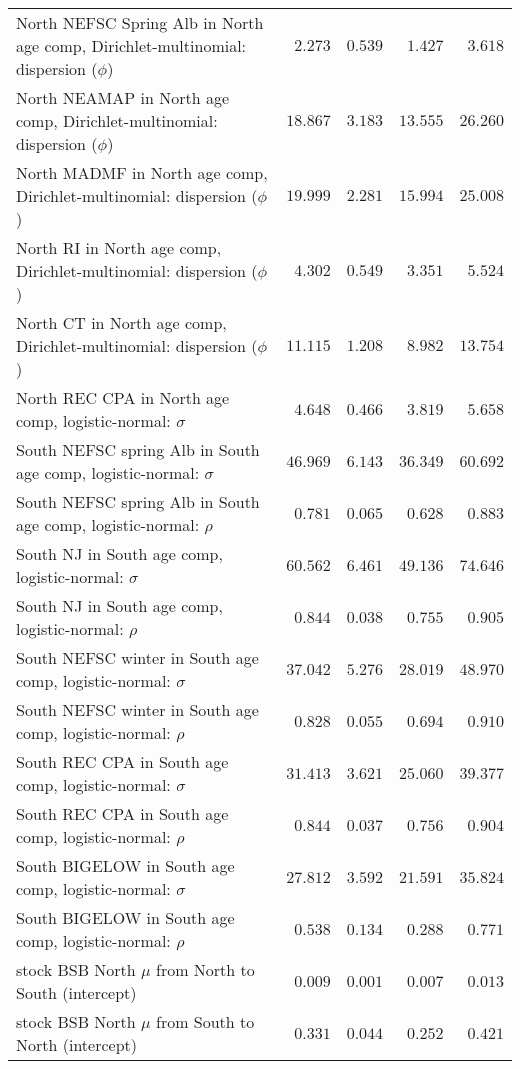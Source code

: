 \documentclass[
]{article}
\begin{document}
\begin{landscape}
\begin{longtable}[t]{lrrrr}
North NEFSC Spring Alb in North age comp, Dirichlet-multinomial: dispersion ($\phi$) & $2.273$ & $0.539$ & $1.427$ & $3.618$\\
\addlinespace
North NEAMAP in North age comp, Dirichlet-multinomial: dispersion ($\phi$) & $18.867$ & $3.183$ & $13.555$ & $26.260$\\
North MADMF in North age comp, Dirichlet-multinomial: dispersion ($\phi$) & $19.999$ & $2.281$ & $15.994$ & $25.008$\\
North RI in North age comp, Dirichlet-multinomial: dispersion ($\phi$) & $4.302$ & $0.549$ & $3.351$ & $5.524$\\
North CT in North age comp, Dirichlet-multinomial: dispersion ($\phi$) & $11.115$ & $1.208$ & $8.982$ & $13.754$\\
North REC CPA in North age comp, logistic-normal: $\sigma$ & $4.648$ & $0.466$ & $3.819$ & $5.658$\\
\addlinespace
South NEFSC spring Alb in South age comp, logistic-normal: $\sigma$ & $46.969$ & $6.143$ & $36.349$ & $60.692$\\
South NEFSC spring Alb in South age comp, logistic-normal: $\rho$ & $0.781$ & $0.065$ & $0.628$ & $0.883$\\
South NJ in South age comp, logistic-normal: $\sigma$ & $60.562$ & $6.461$ & $49.136$ & $74.646$\\
South NJ in South age comp, logistic-normal: $\rho$ & $0.844$ & $0.038$ & $0.755$ & $0.905$\\
South NEFSC winter in South age comp, logistic-normal: $\sigma$ & $37.042$ & $5.276$ & $28.019$ & $48.970$\\
\addlinespace
South NEFSC winter in South age comp, logistic-normal: $\rho$ & $0.828$ & $0.055$ & $0.694$ & $0.910$\\
South REC CPA in South age comp, logistic-normal: $\sigma$ & $31.413$ & $3.621$ & $25.060$ & $39.377$\\
South REC CPA in South age comp, logistic-normal: $\rho$ & $0.844$ & $0.037$ & $0.756$ & $0.904$\\
South BIGELOW in South age comp, logistic-normal: $\sigma$ & $27.812$ & $3.592$ & $21.591$ & $35.824$\\
South BIGELOW in South age comp, logistic-normal: $\rho$ & $0.538$ & $0.134$ & $0.288$ & $0.771$\\
\addlinespace
stock BSB North $\mu$ from North to South (intercept) & $0.009$ & $0.001$ & $0.007$ & $0.013$\\
stock BSB North $\mu$ from South to North (intercept) & $0.331$ & $0.044$ & $0.252$ & $0.421$\\

\end{longtable}
\end{landscape}
\end{document}
